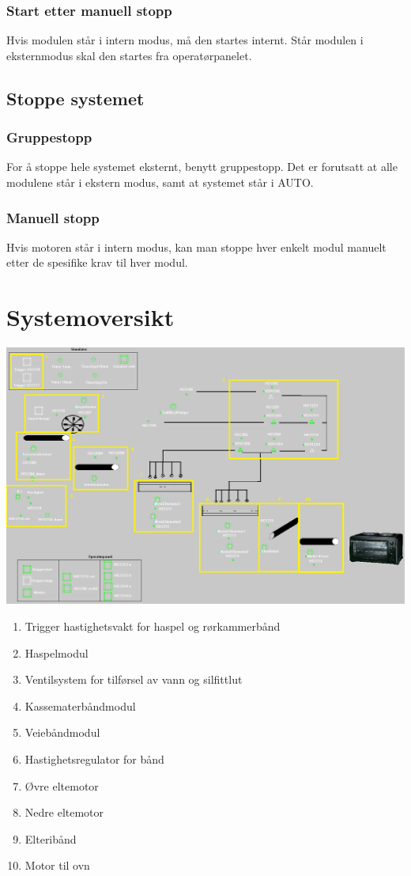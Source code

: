 \subsubsection*{Start etter manuell stopp}
Hvis modulen står i intern modus, må den startes internt. Står modulen i eksternmodus skal den startes fra operatørpanelet. 

\subsection{Stoppe systemet}
\subsubsection*{Gruppestopp}
For å stoppe hele systemet eksternt, benytt gruppestopp. Det er forutsatt at alle modulene står i ekstern modus, samt at systemet står i AUTO. 
\subsubsection*{Manuell stopp}
Hvis motoren står i intern modus, kan man stoppe hver enkelt modul manuelt etter de spesifike krav til hver modul. 

\newpage

\section{Systemoversikt}

\includegraphics[width=\textwidth]{oversikt.png}

\begin{enumerate}
  \item Trigger hastighetsvakt for haspel og rørkammerbånd
  \item Haspelmodul
  \item Ventilsystem for tilførsel av vann og silfittlut
  \item Kassematerbåndmodul
  \item Veiebåndmodul
  \item Hastighetsregulator for bånd
  \item Øvre eltemotor
  \item Nedre eltemotor
  \item Elteribånd
  \item Motor til ovn
\end{enumerate}
